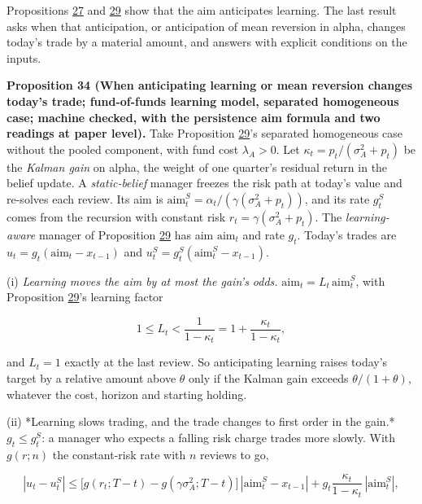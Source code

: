 \documentclass[11pt]{article}
\begin{document}
Propositions \hyperref[res:Proposition-27]{27} and \hyperref[res:Proposition-29]{29} show that the aim anticipates learning. The
last result asks when that anticipation, or anticipation of mean
reversion in alpha, changes today's trade by a material amount, and
answers with explicit conditions on the inputs.

\label{res:Proposition-34}
\textbf{Proposition 34 (When anticipating learning or mean reversion changes today's trade; fund-of-funds learning model, separated homogeneous case; machine checked, with the persistence aim formula and two readings at paper level).}
Take Proposition \hyperref[res:Proposition-29]{29}'s separated homogeneous case without the pooled
component, with fund cost \(\lambda_A>0\). Let
\(\kappa_t=p_t/(\sigma_A^2+p_t)\) be the \emph{Kalman gain} on alpha, the weight of
one quarter's residual return in the belief update. A \emph{static-belief}
manager freezes the risk path at today's value and re-solves each
review. Its aim is \(\mathrm{aim}^S_t=\hat\alpha_t/(\gamma(\sigma_A^2+p_t))\), and its rate
\(g^S_t\) comes from the recursion with constant risk \(r_t=\gamma(\sigma_A^2+p_t)\). The
\emph{learning-aware} manager of Proposition \hyperref[res:Proposition-29]{29} has aim \(\mathrm{aim}_t\) and rate
\(g_t\). Today's trades are \(u_t=g_t(\mathrm{aim}_t-x_{t-1})\) and
\(u^S_t=g^S_t(\mathrm{aim}^S_t-x_{t-1})\).

(i) \emph{Learning moves the aim by at most the gain's odds.}
\(\mathrm{aim}_t=L_t\,\mathrm{aim}^S_t\), with Proposition \hyperref[res:Proposition-29]{29}'s learning factor

\begin{equation*}
1\leq L_t<\frac1{1-\kappa_t}=1+\frac{\kappa_t}{1-\kappa_t},\tag{104}\label{eq:104}
\end{equation*}

and \(L_t=1\) exactly at the last review. So anticipating learning
raises today's target by a relative amount above \(\theta\) only if the
Kalman gain exceeds \(\theta/(1+\theta)\), whatever the cost, horizon and
starting holding.

(ii) *Learning slows trading, and the trade changes to first order in
the gain.* \(g_t\leq g^S_t\): a manager who expects a falling risk charge
trades more slowly. With \(g(r;n)\) the constant-risk rate with \(n\)
reviews to go,

\begin{equation*}
|u_t-u^S_t|\leq\bigl[g(r_t;T-t)-g(\gamma\sigma_A^2;T-t)\bigr]\,|\mathrm{aim}^S_t-x_{t-1}|
 +g_t\frac{\kappa_t}{1-\kappa_t}\,|\mathrm{aim}^S_t|,\tag{105}\label{eq:105}
\end{equation*}
\end{document}
